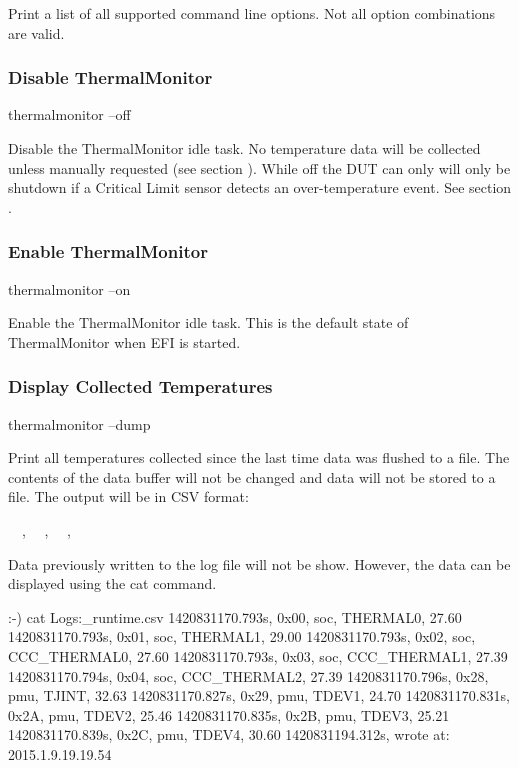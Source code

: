 Print a list of all supported command line options. Not all option combinations are valid.

\subsubsection{Disable ThermalMonitor}

\begin{CommandLine}
thermalmonitor --off
\end{CommandLine}

Disable the ThermalMonitor idle task. No temperature data will be collected unless manually
requested (see section ). While off the DUT can only will
only be shutdown if a Critical Limit sensor detects an over-temperature event.
See section .

\subsubsection{Enable ThermalMonitor}

\begin{CommandLine}
thermalmonitor --on
\end{CommandLine}

Enable the ThermalMonitor idle task.  This is the default state of
ThermalMonitor when EFI is started.

\subsubsection{Display Collected Temperatures}
\label{sec:DisplayCollectedTemperatures}

\begin{CommandLine}
thermalmonitor --dump
\end{CommandLine}

Print all temperatures collected since the last time data was flushed to a
file.  The contents of the data buffer will not be changed and data will not be
stored to a file. The output will be in CSV format: 

\begin{Setting}
~~, ~~, ~~, ~~
\end{Setting}

Data previously written to the log file will not be show. However, the data
can be displayed using the cat command.

\begin{LogExcerpt}
:-) cat Logs:\MobileMediaFactoryLogs\LogCollector\FactoryDebug\temperature_runtime.csv
1420831170.793s, 0x00, soc, THERMAL0, 27.60
1420831170.793s, 0x01, soc, THERMAL1, 29.00
1420831170.793s, 0x02, soc, CCC_THERMAL0, 27.60
1420831170.793s, 0x03, soc, CCC_THERMAL1, 27.39
1420831170.794s, 0x04, soc, CCC_THERMAL2, 27.39
1420831170.796s, 0x28, pmu, TJINT, 32.63
1420831170.827s, 0x29, pmu, TDEV1, 24.70
1420831170.831s, 0x2A, pmu, TDEV2, 25.46
1420831170.835s, 0x2B, pmu, TDEV3, 25.21
1420831170.839s, 0x2C, pmu, TDEV4, 30.60
1420831194.312s, wrote at: 2015.1.9.19.19.54
\end{LogExcerpt}

